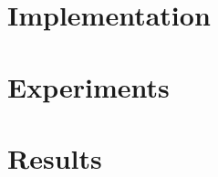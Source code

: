 \documentclass{beamer}
\begin{document}
\section[Implementation]{Implementation}

\section[Experiments]{Experiments}

\section[Results]{Results}








\end{document}
